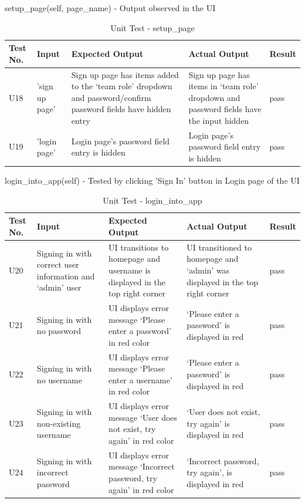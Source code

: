 \documentclass[12pt, titlepage]{article}
\begin{document}
    setup\_page(self, page\_name) - Output observed in the UI \newline
\begin{table}[H]
  \begin{tabular}{| p{} | p{}| p{}| p{}| p{}|}
    \hline
    \rowcolor[gray]{0.9}
    Test No. & Input & Expected Output & Actual Output & Result\\
    \hline
    U18 & 'sign up page' & Sign up page has items added to the ‘team role’ dropdown and password/confirm password fields have hidden entry & Sign up page has items in ‘team role’ dropdown and password fields have the input hidden & pass \\
    \hline
    U19 & 'login page' & Login page’s password field entry is hidden & Login page’s password field entry is hidden & pass \\
    \hline
  \end{tabular}
  \caption{Unit Test - setup\_page}
\end{table}

\newpage
login\_into\_app(self) - Tested by clicking 'Sign In' button in Login page of the UI
\begin{table}[H]
  \begin{tabular}{| p{} | p{}| p{}| p{}| p{}|}
    \hline
    \rowcolor[gray]{0.9}
    Test No. & Input & Expected Output & Actual Output & Result\\
    \hline
    U20 & Signing in with correct user information and ‘admin’ user  & UI transitions to homepage and username is displayed in the top right corner  & UI transitioned to homepage and ‘admin’ was displayed in the top right corner & pass \\
    \hline
    U21 & Signing in with no password & UI displays error message ‘Please enter a password’ in red color & ‘Please enter a password’ is displayed in red & pass \\
    \hline
    U22 & Signing in with no username & UI displays error message ‘Please enter a username’ in red color & ‘Please enter a password’ is displayed in red & pass \\
    \hline
    U23 & Signing in with non-existing username & UI displays error message ‘User does not exist, try again’ in red color & ‘User does not exist, try again’ is displayed in red & pass \\
    \hline
    U24 & Signing in with incorrect password & UI displays error message ‘Incorrect password, try again’ in red color & ‘Incorrect password, try again’, is displayed in red & pass \\
    \hline
  \end{tabular}
  \caption{Unit Test - login\_into\_app}
\end{table}
\end{document}
